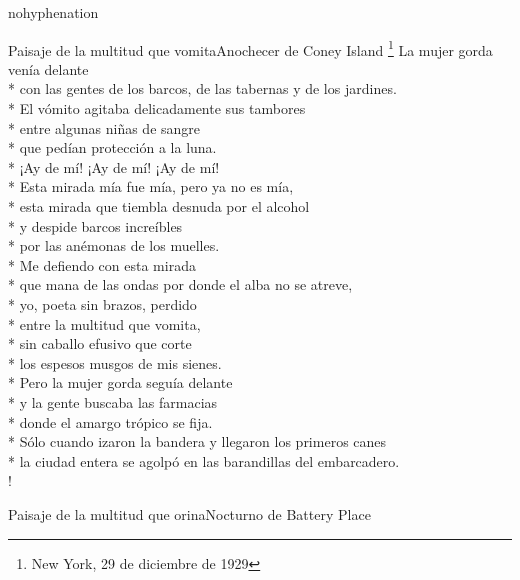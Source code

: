 \documentclass[
    a5paper,
    DIV=10,
    12pt,
    notitlepage,
    oneside,]
{scrbook} %
\begin{document}
\begin{hyphenrules}{nohyphenation}
\begin{poem}{Paisaje de la multitud que vomita}{Anochecer de Coney Island \footnote{New York, 29 de diciembre de 1929}}{}
La mujer gorda venía delante\\*
con las gentes de los barcos, de las tabernas y de los jardines.\\*
El vómito agitaba delicadamente sus tambores\\*
entre algunas niñas de sangre\\*
que pedían protección a la luna.\\*
¡Ay de mí! ¡Ay de mí! ¡Ay de mí!\\*
Esta mirada mía fue mía, pero ya no es mía,\\*
esta mirada que tiembla desnuda por el alcohol\\*
y despide barcos increíbles\\*
por las anémonas de los muelles.\\*
Me defiendo con esta mirada\\*
que mana de las ondas por donde el alba no se atreve,\\*
yo, poeta sin brazos, perdido\\*
entre la multitud que vomita,\\*
sin caballo efusivo que corte\\*
los espesos musgos de mis sienes.\\*
Pero la mujer gorda seguía delante\\*
y la gente buscaba las farmacias\\*
donde el amargo trópico se fija.\\*
Sólo cuando izaron la bandera y llegaron los primeros canes\\*
la ciudad entera se agolpó en las barandillas del embarcadero.\\!

\end{poem}

\begin{poem}{Paisaje de la multitud que orina}{Nocturno de Battery Place}{}


\end{poem}
\end{hyphenrules}
\end{document}
